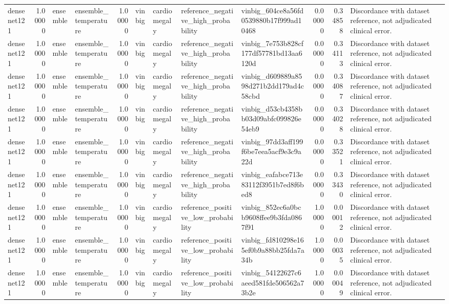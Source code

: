 \begin{tabular}{lrllrllllrrl}
densenet121 & 1.00000 & ensemble & ensemble\_temperature & 1.00000 & vinbig & cardiomegaly & reference\_negative\_high\_probability & vinbig\_604ce8a56fd0539880b17f999ad10468 & 0.00000 & 0.34858 & Discordance with dataset reference, not adjudicated clinical error. \\
densenet121 & 1.00000 & ensemble & ensemble\_temperature & 1.00000 & vinbig & cardiomegaly & reference\_negative\_high\_probability & vinbig\_7e753b828cf177df57781bd13aa6120d & 0.00000 & 0.34113 & Discordance with dataset reference, not adjudicated clinical error. \\
densenet121 & 1.00000 & ensemble & ensemble\_temperature & 1.00000 & vinbig & cardiomegaly & reference\_negative\_high\_probability & vinbig\_d609889a8598d271b2dd179ad4c58cbd & 0.00000 & 0.34087 & Discordance with dataset reference, not adjudicated clinical error. \\
densenet121 & 1.00000 & ensemble & ensemble\_temperature & 1.00000 & vinbig & cardiomegaly & reference\_negative\_high\_probability & vinbig\_d53cb4358bb03d09abfc099826e54eb9 & 0.00000 & 0.34028 & Discordance with dataset reference, not adjudicated clinical error. \\
densenet121 & 1.00000 & ensemble & ensemble\_temperature & 1.00000 & vinbig & cardiomegaly & reference\_negative\_high\_probability & vinbig\_97dd3aff199f6be7eea5acf9e3c9a22d & 0.00000 & 0.33521 & Discordance with dataset reference, not adjudicated clinical error. \\
densenet121 & 1.00000 & ensemble & ensemble\_temperature & 1.00000 & vinbig & cardiomegaly & reference\_negative\_high\_probability & vinbig\_eafabce713e83112f3951b7ed8f6bed8 & 0.00000 & 0.33430 & Discordance with dataset reference, not adjudicated clinical error. \\
densenet121 & 1.00000 & ensemble & ensemble\_temperature & 1.00000 & vinbig & cardiomegaly & reference\_positive\_low\_probability & vinbig\_852ec6a0bcb9608ffee9b3fda0867f91 & 1.00000 & 0.00012 & Discordance with dataset reference, not adjudicated clinical error. \\
densenet121 & 1.00000 & ensemble & ensemble\_temperature & 1.00000 & vinbig & cardiomegaly & reference\_positive\_low\_probability & vinbig\_fd810298e165ef0b9a88bb25fda7a34b & 1.00000 & 0.00035 & Discordance with dataset reference, not adjudicated clinical error. \\
densenet121 & 1.00000 & ensemble & ensemble\_temperature & 1.00000 & vinbig & cardiomegaly & reference\_positive\_low\_probability & vinbig\_54122627c6aeed581fde506562a73b2e & 1.00000 & 0.00049 & Discordance with dataset reference, not adjudicated clinical error. \\

\end{tabular}
